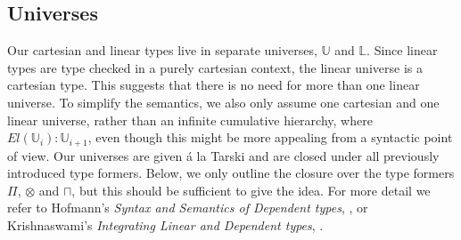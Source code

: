 \documentclass[a4paper,english]{lipics-v2018}
\begin{document}
\subsection{Universes}\label{universes}
Our cartesian and linear types live in separate universes, $\mathbb{U}$ and $\mathbb{L}$. Since linear types are type checked in a purely cartesian context, the linear universe is a cartesian type. This suggests that there is no need for more than one linear universe. 
To simplify the semantics, we also only assume one cartesian and one linear universe, rather than an infinite cumulative hierarchy, where $El(\mathbb{U}_i) : \mathbb{U}_{i+1}$, even though this might be more appealing from a syntactic point of view. Our universes are given á la Tarski and are closed under all previously introduced type formers. Below, we only outline the closure over the type formers $\Pi$, $\otimes$ and $\sqcap$, but this should be sufficient to give the idea. For more detail we refer to Hofmann's \textit{Syntax and Semantics of Dependent types}, \cite{hofmann1997syntax}, or Krishnaswami's \textit{Integrating Linear and Dependent types}, \cite{krishnaswami}.\\
\end{document}
